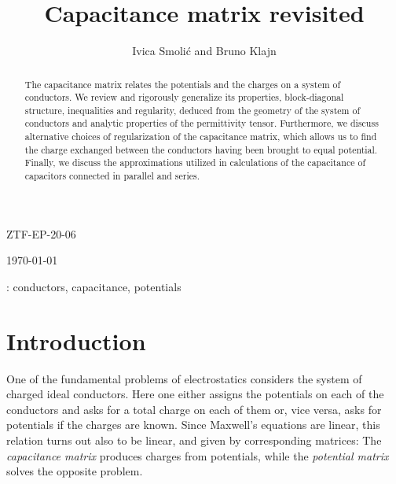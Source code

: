 \documentclass[12pt]{iopart}
\newcommand{\0}{\vct{0}}
\theoremstyle{plain} \newtheorem{tm}{Theorem}[section]
\theoremstyle{plain} \newtheorem{lm}[tm]{Lemma}
\theoremstyle{definition} \newtheorem{defn}[tm]{Definition}
\begin{document}
\begin{flushright}
ZTF-EP-20-06
\end{flushright}

\title[Capacitance matrix revisited]{Capacitance matrix revisited}

\author{Ivica Smoli\'c and Bruno Klajn}

\address{Department of Physics, Faculty of Science, University of Zagreb, Bijeni\v cka cesta 32, 10000 Zagreb, Croatia}
\vspace{10pt}
\begin{indented}
\item[] \today
\end{indented}

\begin{abstract}
The capacitance matrix relates the potentials and the charges on a system of conductors. We review and rigorously generalize its properties, block-diagonal structure, inequalities and regularity, deduced from the geometry of the system of conductors and analytic properties of the permittivity tensor. Furthermore, we discuss alternative choices of regularization of the capacitance matrix, which allows us to find the charge exchanged between the conductors having been brought to equal potential. Finally, we discuss the approximations utilized in calculations of the capacitance of capacitors connected in parallel and series.
\end{abstract}

: conductors, capacitance, potentials






\section{Introduction} %

One of the fundamental problems of electrostatics considers the system of charged ideal conductors. Here one either assigns the potentials on each of the conductors and asks for a total charge on each of them or, vice versa, asks for potentials if the charges are known. Since Maxwell's equations are linear, this relation turns out also to be  linear, and given by corresponding matrices: The \emph{capacitance matrix} produces charges from potentials, while the \emph{potential matrix} solves the opposite problem.
\end{document}
